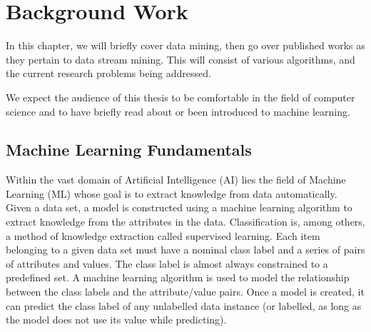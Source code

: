 
\chapter{Background Work} %

\label{chapter:background_work} %
In this chapter, we will briefly cover data mining, then go over published works as they pertain to data stream mining. This will consist of various algorithms, and the current research problems being addressed.

We expect the audience of this thesis to be comfortable in the field of computer science and to have briefly read about or been introduced to machine learning.



\section{Machine Learning Fundamentals}
Within the vast domain of Artificial Intelligence (AI) lies the field of Machine Learning (ML) whose goal is to extract knowledge from data automatically. Given a data set, a model is constructed using a machine learning algorithm to extract knowledge from the attributes in the data. 
Classification is, among others, a method of knowledge extraction called supervised learning. Each item belonging to a given data set must have a nominal class label and a series of pairs of attributes and values. The class label is almost always constrained to a predefined set. A machine learning algorithm is used to model the relationship between the class labels and the attribute/value pairs. Once a model is created, it can predict the class label of any unlabelled data instance (or labelled, as long as the model does not use its value while predicting).

